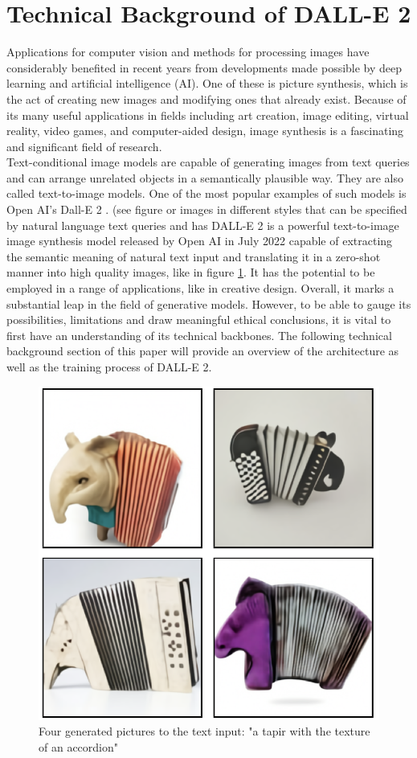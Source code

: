 \documentclass[9pt,twocolumn,twoside]{osajnl}
\begin{document}
\section{Technical Background of DALL-E 2}
Applications for computer vision and methods for processing images have considerably benefited in recent years from developments made possible by deep learning and artificial intelligence (AI). 
One of these is picture synthesis, which is the act of creating new images and modifying ones that already exist. 
Because of its many useful applications in fields including art creation, image editing, virtual reality, video games, and computer-aided design, image synthesis is a fascinating and significant field of research.\\
Text-conditional image models are capable of generating images from text queries and can arrange unrelated objects in a semantically plausible way. They are also called text-to-image models.
One of the most popular examples of such models is Open AI's Dall-E 2 \cite{DallE}. (see figure %
or images in different styles that can be specified by natural language text queries and has 
DALL-E 2 is a powerful text-to-image image synthesis model released by Open AI in July 2022 capable of extracting the semantic meaning of natural text input and translating it in a zero-shot manner \cite{zeroShot} into high quality images, like in figure \ref{exampleTapir}.
It has the potential to be employed in a range of applications, like in creative design. Overall, it marks a substantial leap in the field of generative models.
However, to be able to gauge its possibilities, limitations and draw meaningful ethical conclusions, it is vital to first have an understanding of its technical backbones.
The following technical background section of this paper will provide an overview of the architecture as well as the training process of DALL-E 2. 

\begin{figure}[htbp]
	\centering
	\includegraphics[width=.7\linewidth]{images/DallEExampleTapir.png}
	\caption{Four generated pictures to the text input: "a tapir with the texture of an accordion" \cite{zeroShot}}
	\label{exampleTapir}
\end{figure}
\end{document}
